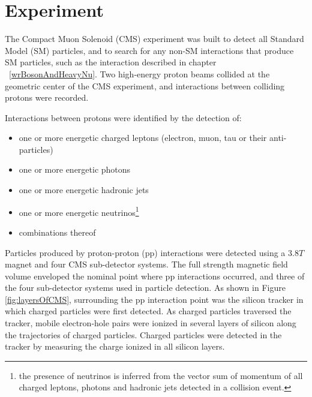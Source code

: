 \chapter{Experiment}
\label{experiment_chapter}
The Compact Muon Solenoid (CMS) experiment was built to detect all Standard Model (SM) particles, and to
search for any non-SM interactions that produce SM particles, such as the interaction described in 
chapter ~\ref{wrBosonAndHeavyNu}.  Two high-energy proton beams collided at the geometric center of
the CMS experiment, and interactions between colliding protons were recorded.

Interactions between protons were identified by the detection of:
\begin{itemize}
	\item one or more energetic charged leptons (electron, muon, tau or their anti-particles)
	\item one or more energetic photons
	\item one or more energetic hadronic jets
	\item one or more energetic neutrinos\footnote{the presence of neutrinos is inferred from the vector sum of momentum of all charged leptons, photons and hadronic jets detected in a collision event.}
	\item combinations thereof
\end{itemize}
Particles produced by proton-proton (pp) interactions were detected using a 3.8$\unit{T}$ magnet and four CMS 
sub-detector systems.  The full strength magnetic field volume enveloped the nominal point where pp interactions occurred, and three of the four 
sub-detector systems used in particle detection.  As shown in Figure \ref{fig:layersOfCMS}, surrounding the pp interaction
point was the silicon tracker in which charged particles were first detected.  As charged particles traversed
the tracker, mobile electron-hole pairs were ionized in several layers of silicon along the trajectories of charged
particles.  Charged particles were detected in the tracker by measuring the charge ionized in all silicon layers.

